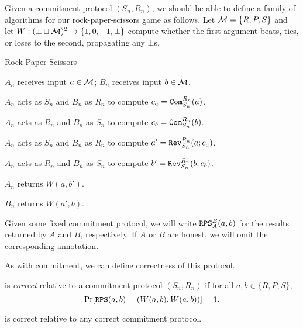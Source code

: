 \noindent
Given a commitment protocol $(S_n,R_n)$, we should be able to define a family of
algorithms for our rock-paper-scissors game as follows. Let $\mathcal{M} = \{R,P,S\}$
and let $W: (\bot\sqcup\mathcal{M})^2\rightarrow\{1,0,-1,\bot\}$ compute whether the
first argument beats, ties, or loses to the second, propagating any $\bot$s.

\begin{prot}{Rock-Paper-Scissors}\label{prot:rock-paper-scissors}
	\item $A_n$ receives input $a\in\mathcal{M}$; $B_n$ receives input $b\in\mathcal{M}$.
	\item $A_n$ acts as $S_n$ and $B_n$ as $R_n$ to compute $c_a = {\texttt{Com}}_{S_n}^{R_n}(a)$.
	\item $A_n$ acts as $R_n$ and $B_n$ as $S_n$ to compute $c_b = {\texttt{Com}}_{S_n}^{R_n}(b)$.
	\item $A_n$ acts as $S_n$ and $B_n$ as $R_n$ to compute $a' = {\texttt{Rev}}_{S_n}^{R_n}(a;c_a)$.
	\item $A_n$ acts as $R_n$ and $B_n$ as $S_n$ to compute $b' = {\texttt{Rev}}_{S_n}^{R_n}(b;c_b)$.
	\item $A_n$ returns $W(a,b')$.
	\item $B_n$ returns $W(a',b)$.
\end{prot}

\begin{ntn}
	Given some fixed commitment protocol, we will write
	${\texttt{RPS}}_{A}^{B}(a,b)$ for the results returned by $A$ and $B$,
	respectively. If $A$ or $B$ are honest, we will omit the corresponding
	annotation.
\end{ntn}

\noindent
As with commitment, we can define correctness of this protocol.
\begin{dfn}
	 is \emph{correct} relative to a commitment
	protocol $(S_n,R_n)$ if for all $a,b\in\{R,P,S\}$,
	\[
		\Pr[{\texttt{RPS}}(a, b) = (W(a,b), W(a,b))] = 1.
	\]
\end{dfn}

\begin{thm}
	 is correct relative to any correct commitment
	protocol.
\end{thm}

